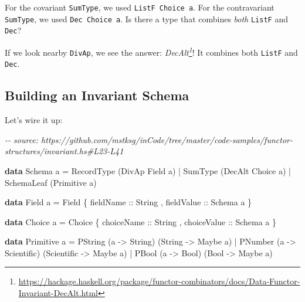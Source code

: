 \documentclass[]{article}
\newenvironment{Shaded}{}{}
\newcommand{\CommentTok}[1]{\textcolor[rgb]{0.38,0.63,0.69}{\textit{#1}}}
\newcommand{\DataTypeTok}[1]{\textcolor[rgb]{0.56,0.13,0.00}{#1}}
\newcommand{\KeywordTok}[1]{\textcolor[rgb]{0.00,0.44,0.13}{\textbf{#1}}}
\newcommand{\NormalTok}[1]{#1}
\newcommand{\OperatorTok}[1]{\textcolor[rgb]{0.40,0.40,0.40}{#1}}
\newcommand{\OtherTok}[1]{\textcolor[rgb]{0.00,0.44,0.13}{#1}}
\renewcommand{\href}[2]{#2\footnote{\url{#1}}}
\begin{document}
For the covariant \texttt{SumType}, we used \texttt{ListF\ Choice\ a}. For the
contravariant \texttt{SumType}, we used \texttt{Dec\ Choice\ a}. Is there a type
that combines \emph{both} \texttt{ListF} and \texttt{Dec}?

If we look nearby \texttt{DivAp}, we see the answer:
\emph{\href{https://hackage.haskell.org/package/functor-combinators/docs/Data-Functor-Invariant-DecAlt.html}{DecAlt}}!
It combines both \texttt{ListF} and \texttt{Dec}.

\hypertarget{building-an-invariant-schema}{%
\subsection{Building an Invariant Schema}\label{building-an-invariant-schema}}

Let's wire it up:

\begin{Shaded}
\begin{Highlighting}[]
\CommentTok{{-}{-} source: https://github.com/mstksg/inCode/tree/master/code{-}samples/functor{-}structures/invariant.hs\#L23{-}L41}

\KeywordTok{data} \DataTypeTok{Schema}\NormalTok{ a }\OtherTok{=}
      \DataTypeTok{RecordType}\NormalTok{  (}\DataTypeTok{DivAp}  \DataTypeTok{Field}\NormalTok{  a)}
    \OperatorTok{|} \DataTypeTok{SumType}\NormalTok{     (}\DataTypeTok{DecAlt} \DataTypeTok{Choice}\NormalTok{ a)}
    \OperatorTok{|} \DataTypeTok{SchemaLeaf}\NormalTok{  (}\DataTypeTok{Primitive}\NormalTok{ a)}

\KeywordTok{data} \DataTypeTok{Field}\NormalTok{ a }\OtherTok{=} \DataTypeTok{Field}
\NormalTok{    \{}\OtherTok{ fieldName  ::} \DataTypeTok{String}
\NormalTok{    ,}\OtherTok{ fieldValue ::} \DataTypeTok{Schema}\NormalTok{ a}
\NormalTok{    \}}

\KeywordTok{data} \DataTypeTok{Choice}\NormalTok{ a }\OtherTok{=} \DataTypeTok{Choice}
\NormalTok{    \{}\OtherTok{ choiceName  ::} \DataTypeTok{String}
\NormalTok{    ,}\OtherTok{ choiceValue ::} \DataTypeTok{Schema}\NormalTok{ a}
\NormalTok{    \}}

\KeywordTok{data} \DataTypeTok{Primitive}\NormalTok{ a }\OtherTok{=}
      \DataTypeTok{PString}\NormalTok{ (a }\OtherTok{{-}>} \DataTypeTok{String}\NormalTok{)     (}\DataTypeTok{String}     \OtherTok{{-}>} \DataTypeTok{Maybe}\NormalTok{ a)}
    \OperatorTok{|} \DataTypeTok{PNumber}\NormalTok{ (a }\OtherTok{{-}>} \DataTypeTok{Scientific}\NormalTok{) (}\DataTypeTok{Scientific} \OtherTok{{-}>} \DataTypeTok{Maybe}\NormalTok{ a)}
    \OperatorTok{|} \DataTypeTok{PBool}\NormalTok{   (a }\OtherTok{{-}>} \DataTypeTok{Bool}\NormalTok{)       (}\DataTypeTok{Bool}       \OtherTok{{-}>} \DataTypeTok{Maybe}\NormalTok{ a)}
\end{Highlighting}
\end{Shaded}
\end{document}
